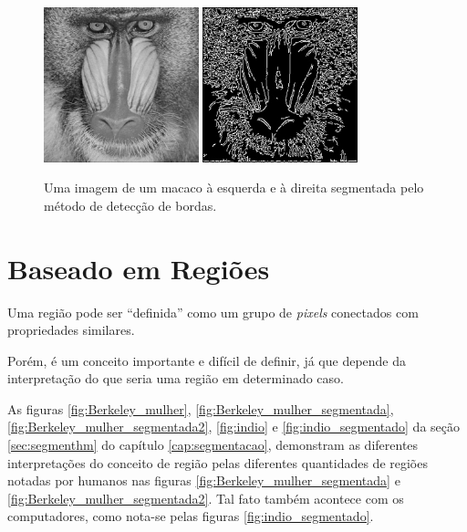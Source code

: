\begin{figure}[!htb]
 \centering
 \def\baselinestretch{1}\small\normalsize
 \includegraphics[width=0.4\textwidth]{img/stf-smandrill.jpg}\qquad
 \includegraphics[width=0.4\textwidth]{img/stf-smandrill-edgedetect.jpg} 
 \caption{\label{fig:smandrill} Uma imagem de um macaco \citep{stanford} à esquerda e à direita segmentada pelo método de detecção de bordas.}
\end{figure}


\section{Baseado em Regiões}
Uma região pode ser “definida” como um grupo de \textit{pixels} conectados com propriedades similares.

Porém, é um conceito importante e difícil de definir, já que depende da interpretação do que seria uma região  em determinado caso.

As figuras \ref{fig:Berkeley_mulher}, \ref{fig:Berkeley_mulher_segmentada}, \ref{fig:Berkeley_mulher_segmentada2}, \ref{fig:indio} e \ref{fig:indio_segmentado} da seção \ref{sec:segmenthm} do capítulo \ref{cap:segmentacao}, demonstram as diferentes interpretações do conceito de região pelas diferentes quantidades de regiões notadas por humanos nas figuras \ref{fig:Berkeley_mulher_segmentada} e \ref{fig:Berkeley_mulher_segmentada2}. Tal fato também acontece com os computadores, como nota-se pelas figuras \ref{fig:indio_segmentado}.

